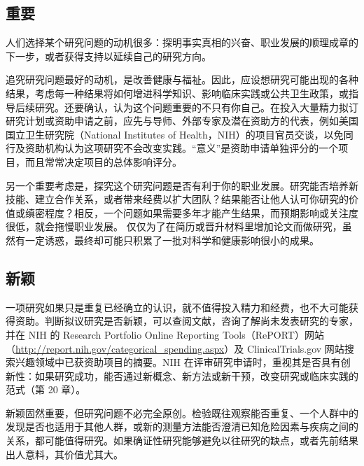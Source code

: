 \subsection{重要}
人们选择某个研究问题的动机很多：探明事实真相的兴奋、职业发展的顺理成章的下一步，或者获得支持以延续自己的研究方向。
\begin{description}[leftmargin=2em,labelindent=0pt,style=nextline]
\item[意义。]追究研究问题最好的动机，是改善健康与福祉。因此，应设想研究可能出现的各种结果，考虑每一种结果将如何增进科学知识、影响临床实践或公共卫生政策，或指导后续研究。还要确认，认为这个问题重要的不只有你自己。在投入大量精力拟订研究计划或资助申请之前，应先与导师、外部专家及潜在资助方的代表，例如美国国立卫生研究院（National Institutes of Health，NIH）的项目官员交谈，以免同行及资助机构认为这项研究不会改变实践。“意义”是资助申请单独评分的一个项目，而且常常决定项目的总体影响评分。
\item[促进职业发展。]另一个重要考虑是，探究这个研究问题是否有利于你的职业发展。研究能否培养新技能、建立合作关系，或者带来经费以扩大团队？结果能否让他人认可你研究的价值或缜密程度？相反，一个问题如果需要多年才能产生结果，而预期影响或关注度很低，就会拖慢职业发展。
仅仅为了在简历或晋升材料里增加论文而做研究，虽然有一定诱惑，最终却可能只积累了一批对科学和健康影响很小的成果。
\end{description}

\subsection{新颖}
一项研究如果只是重复已经确立的认识，就不值得投入精力和经费，也不大可能获得资助。判断拟议研究是否新颖，可以查阅文献，咨询了解尚未发表研究的专家，并在 NIH 的 Research Portfolio Online Reporting Tools（RePORT）网站（\url{http://report.nih.gov/categorical_spending.aspx}）及 ClinicalTrials.gov 网站搜索兴趣领域中已获资助项目的摘要。NIH 在评审研究申请时，重视其是否具有创新性：如果研究成功，能否通过新概念、新方法或新干预，改变研究或临床实践的范式（第 20 章）。

新颖固然重要，但研究问题不必完全原创。检验既往观察能否重复、一个人群中的发现是否也适用于其他人群，或新的测量方法能否澄清已知危险因素与疾病之间的关系，都可能值得研究。如果确证性研究能够避免以往研究的缺点，或者先前结果出人意料，其价值尤其大。

